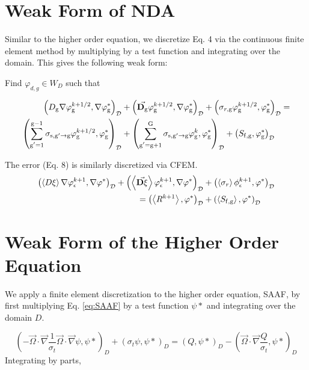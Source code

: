 \section{Weak Form of NDA}
Similar to the higher order equation, we discretize  Eq. 4 via the continuous finite element method by multiplying by a test function and integrating over the domain. This gives the following weak form:

Find $\varphi_{d, g} \in W_D$ such that

  \begin{align}
  \left(D_{\mathrm{g}} \nabla \varphi_{\mathrm{g}}^{k+1/2}, \nabla \varphi^*_{\mathrm{g}}\right)_\mathcal{D} &+ \left(\vec{\bf{D}_{\mathrm{g}}}\varphi_{\mathrm{g}}^{k+1/2} , \nabla \varphi^*_{\mathrm{g}}\right)_\mathcal{D} +  \left(\sigma_{r,\mathrm{g}} \varphi_{\mathrm{g}}^{k+1/2}, \varphi^*_{\mathrm{g}}\right)_\mathcal{D} = \nonumber \\
   \left(\sum\limits_{\substack{\mathrm{g}'=1}}^{\mathrm{g-1}} \sigma_{\mathrm{s},\mathrm{g}' \to\mathrm{g}}\varphi_{\mathrm{g}}^{k+1/2}, \varphi^*_{\mathrm{g}}\right)_\mathcal{D} &+ \left(\sum\limits_{\substack{\mathrm{g}'=\mathrm{g}+1}}^{\mathrm{G}} \sigma_{\mathrm{s},\mathrm{g}' \to\mathrm{g}}\varphi_{\mathrm{g}}^{k}, \varphi^*_{\mathrm{g}}\right)_\mathcal{D} 
  + \left(S_\mathrm{f,g}, \varphi^*_{\mathrm{g}}\right)_\mathcal{D}  \label{k1/2}
  \end{align}


The error (Eq. 8) is similarly discretized via CFEM.
  \begin{align}
  \left(\left< D\xi \right >\nabla \varphi_{\epsilon}^{k+1}, \nabla \varphi^* \right)_\mathcal{D} + \left(\left<\vec{\bf{D}\xi} \right>\varphi_{\epsilon}^{k+1}, \nabla \varphi^* \right)_\mathcal{D} &+ \left(\left<\sigma_r \right>\phi_{\epsilon}^{k+1}, \varphi^* \right)_\mathcal{D}  \nonumber \\= \left(\left<R^{k+1} \right>, \varphi^* \right)_\mathcal{D} &+ \left(\left<S_\mathrm{f,g} \right>, \varphi^* \right)_\mathcal{D} 
  \end{align}

\section{Weak Form of the Higher Order Equation}
We apply a finite element discretization to the higher order equation, SAAF, by first multiplying Eq. \ref{eq:SAAF} by a test function $\psi*$ and integrating over the domain $D$.

\begin{equation}
    \left ( -\vec{\Omega} \cdot \vec{\nabla}\frac{1}{\sigma_t}\vec{\Omega} \cdot \vec{\nabla} \psi, \psi* \right )_D + \left ( \sigma_t \psi, \psi* \right )_D = \left ( Q, \psi* \right)_D - \left ( \vec{\Omega} \cdot \vec{\nabla}\frac{Q}{\sigma_t}, \psi* \right)_D
\end{equation}
Integrating by parts,

